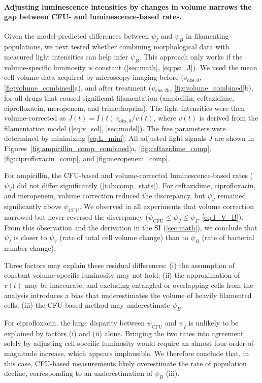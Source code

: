 \paragraph{Adjusting luminescence intensities by changes in volume narrows the gap between CFU- and luminescence-based rates.}
Given the model-predicted differences between \(\psi_I\) and \(\psi_B\) in filamenting populations, we next tested whether combining morphological data with measured light intensities can help infer \(\psi_B\).
This approach only works if the volume-specific luminosity is constant (\autoref{sec:math}, \autoref{eq:psi_J}).
We used the mean cell volume data acquired by microscopy imaging before (\(v_{\mathrm{obs},0}\), \autoref{fig:volume_combined}a), and after treatment (\(v_{\mathrm{obs},2\mathrm h}\), \autoref{fig:volume_combined}b), for all drugs that caused significant filamentation (ampicillin, ceftazidime, ciprofloxacin, meropenem, and trimethoprim).
The light intensities were then volume-corrected as \(J(t)=I(t)\,v_{\mathrm{obs},0}/v(t)\),
where \(v(t)\) is derived from the filamentation model (\eqref{eq:v_sol}, \autoref{sec:model}).
The free parameters were determined by minimizing \autoref{eq:L_mini}.
All adjusted light signals \(J\) are shown in Figures~\ref{fig:ampicillin_comp_combined}a, \ref{fig:ceftazidime_comp}, \ref{fig:ciprofloxacin_comp}, and \ref{fig:meropenem_comp}.

For ampicillin, the CFU-based and volume-corrected luminescence-based rates ($\psi_J$) did not differ significantly (\autoref{tab:comp_stats}).
For ceftazidime, ciprofloxacin, and meropenem, volume correction reduced the discrepancy, but $\psi_J$ remained significantly above $\psi_\mathrm{CFU}$.
We observed in all experiments that volume correction narrowed but never reversed the discrepancy (\(\psi_{\mathrm{CFU}} \le \psi_J \le \psi_I\), \autoref{eq:I_V_B}).
From this observation and the derivation in the SI (\autoref{sec:math}), we conclude that \(\psi_I\) is closer to \(\psi_V\) (rate of total cell volume change) than to \(\psi_B\) (rate of bacterial number change).

Three factors may explain these residual differences:
(i) the assumption of constant volume-specific luminosity may not hold;
(ii) the approximation of \(v(t)\) may be inaccurate, and excluding entangled or overlapping cells from the analysis introduces a bias that underestimates the volume of heavily filamented cells;
(iii) the CFU-based method may underestimate $\psi_B$.

For ciprofloxacin, the large disparity between \(\psi_{\mathrm{CFU}}\) and \(\psi_I\) is unlikely to be explained by factors (i) and (ii) alone.
Bringing the two rates into agreement solely by adjusting cell-specific luminosity would require an almost four-order-of-magnitude increase, which appears implausible.
We therefore conclude that, in this case, CFU-based measurements likely overestimate the rate of population decline, corresponding to an underestimation of \(\psi_B\) (iii).

